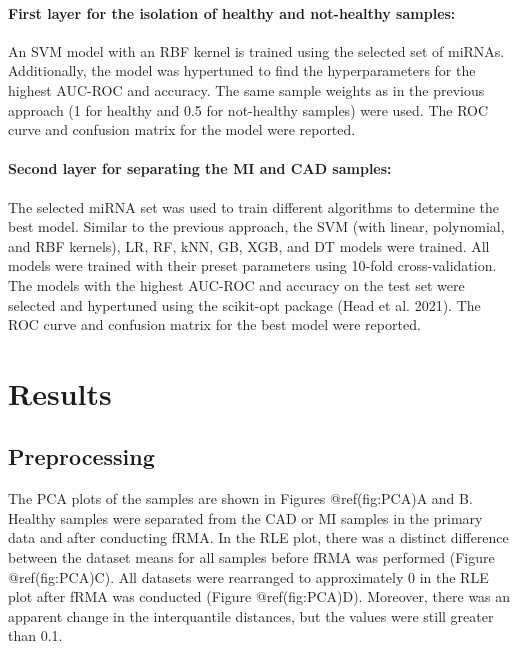 \documentclass[smallextended]{svjour3}       %
\begin{document}
\hypertarget{first-layer-for-the-isolation-of-healthy-and-not-healthy-samples-1}{%
\paragraph{First layer for the isolation of healthy and not-healthy
samples:}\label{first-layer-for-the-isolation-of-healthy-and-not-healthy-samples-1}}

An SVM model with an RBF kernel is trained using the selected set of
miRNAs. Additionally, the model was hypertuned to find the
hyperparameters for the highest AUC-ROC and accuracy. The same sample
weights as in the previous approach (1 for healthy and 0.5 for
not-healthy samples) were used. The ROC curve and confusion matrix for
the model were reported.

\hypertarget{second-layer-for-separating-the-mi-and-cad-samples-1}{%
\paragraph{Second layer for separating the MI and CAD
samples:}\label{second-layer-for-separating-the-mi-and-cad-samples-1}}

The selected miRNA set was used to train different algorithms to
determine the best model. Similar to the previous approach, the SVM
(with linear, polynomial, and RBF kernels), LR, RF, kNN, GB, XGB, and DT
models were trained. All models were trained with their preset
parameters using 10-fold cross-validation. The models with the highest
AUC-ROC and accuracy on the test set were selected and hypertuned using
the scikit-opt package (Head et al. 2021). The ROC curve and confusion
matrix for the best model were reported.

\hypertarget{results}{%
\section{Results}\label{results}}

\hypertarget{preprocessing-1}{%
\subsection{Preprocessing}\label{preprocessing-1}}

The PCA plots of the samples are shown in Figures @ref(fig:PCA)A and B.
Healthy samples were separated from the CAD or MI samples in the primary
data and after conducting fRMA. In the RLE plot, there was a distinct
difference between the dataset means for all samples before fRMA was
performed (Figure @ref(fig:PCA)C). All datasets were rearranged to
approximately 0 in the RLE plot after fRMA was conducted (Figure
@ref(fig:PCA)D). Moreover, there was an apparent change in the
interquantile distances, but the values were still greater than 0.1.
\end{document}

